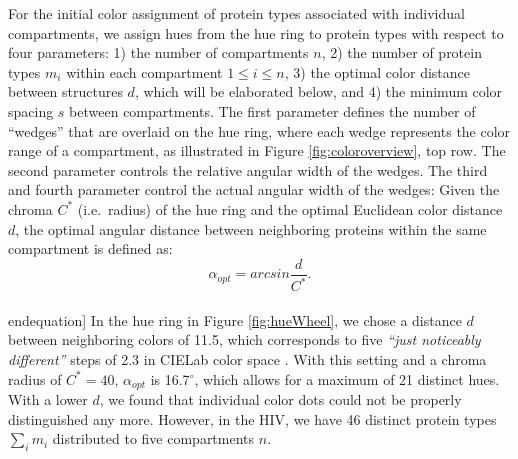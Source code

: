 \documentclass{egpubl}
\begin{document}
	For the initial color assignment of protein types associated with individual compartments, we assign hues from the hue ring to protein types with respect to four parameters: 
	1) the number of compartments $n$, 2) the number of protein types $m_i$ within each compartment $1 \leq i \leq n$, 3) the optimal color distance between structures $d$, which will be elaborated below, and 4) the minimum color spacing $s$ between compartments. 
	The first parameter defines the number of ``wedges'' that are overlaid on the hue ring, where each wedge represents the color range of a compartment, as illustrated in Figure \ref{fig:coloroverview}, top row. 
	The second parameter controls the relative angular width of the wedges. 
	The third and fourth parameter control the actual angular width of the wedges: 
	Given the chroma $C^*$ (i.e.\, radius) of the hue ring and the optimal Euclidean color distance $d$, the optimal angular distance between neighboring proteins within the same compartment is defined as: 
	\begin{equation}%
	\alpha_{opt} = arcsin\frac{d}{C^*}. %
	\end{equation}\\end{equation}]%
	In the hue ring in Figure \ref{fig:hueWheel}, we chose a distance $d$ between neighboring colors of 11.5, which corresponds to five \textit{``just noticeably different''} steps of 2.3 in CIELab color space \cite{lee2013perceptually}. 
	With this setting and a chroma radius of $C^*=40$, $\alpha_{opt}$ is 16.7$^{\circ}$, which allows for a maximum of 21 distinct hues. 
	With a lower $d$, we found that individual color dots could not be properly distinguished any more. 
	However, in the HIV, we have 46 distinct protein types $\sum_{i} m_i$ distributed to five compartments $n$. 
\end{document}
